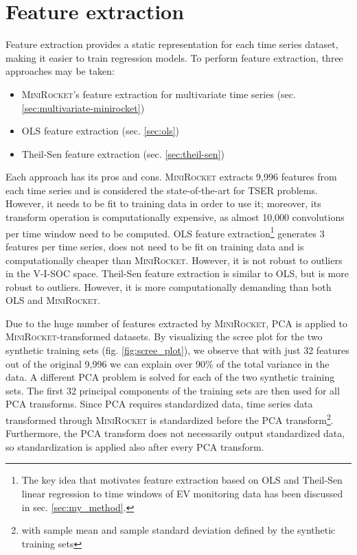 \section{Feature extraction}
\label{sec:feature_extraction}
Feature extraction provides a static representation for each time series dataset, making it easier to train regression models. To perform feature extraction, three approaches may be taken:
\begin{itemize}
    \item \textsc{MiniRocket}'s feature extraction for multivariate time series (sec. \ref{sec:multivariate-minirocket})
    \item OLS feature extraction (sec. \ref{sec:ols})
    \item Theil-Sen feature extraction (sec. \ref{sec:theil-sen})
\end{itemize}
Each approach has its pros and cons. \textsc{MiniRocket} extracts 9,996 features from each time series and is considered the state-of-the-art for TSER problems. However, it needs to be fit to training data in order to use it; moreover, its transform operation is computationally expensive, as almost 10,000 convolutions per time window need to be computed. OLS feature extraction\footnote{The key idea that motivates feature extraction based on OLS and Theil-Sen linear regression to time windows of EV monitoring data has been discussed in sec. \ref{sec:my_method}.\label{note:ols_ts_feat_extr}} generates 3 features per time series, does not need to be fit on training data and is computationally cheaper than \textsc{MiniRocket}. However, it is not robust to outliers in the V-I-SOC space. Theil-Sen feature extraction is similar to OLS, but is more robust to outliers. However, it is more computationally demanding than both OLS and \textsc{MiniRocket}.

Due to the huge number of features extracted by \textsc{MiniRocket}, PCA is applied to \textsc{MiniRocket}-transformed datasets. By visualizing the scree plot for the two synthetic training sets (fig. \ref{fig:scree_plot}), we observe that with just 32 features out of the original 9,996 we can explain over 90\% of the total variance in the data. A different PCA problem is solved for each of the two synthetic training sets. The first 32 principal components of the training sets are then used for all PCA transforms. Since PCA requires standardized data, time series data transformed through \textsc{MiniRocket} is standardized before the PCA transform\footnote{with sample mean and sample standard deviation defined by the synthetic training sets\label{note:pca_standardization}}. Furthermore, the PCA transform does not necessarily output standardized data, so standardization is applied also after every PCA transform.

